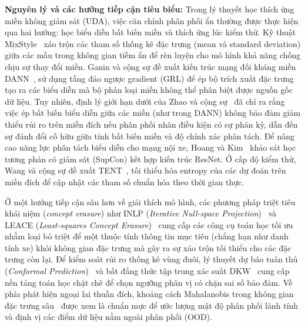 \documentclass[12pt, a4paper, reqno, oneside]{book}
\begin{document}
\textbf{Nguyên lý và các hướng tiếp cận tiêu biểu:}
Trong lý thuyết học thích ứng miền không giám sát (UDA), việc căn chỉnh phân phối ẩn thường được thực hiện qua hai hướng: học biểu diễn bất biến miền và thích ứng lúc kiểm thử. Kỹ thuật MixStyle~\cite{zhou2021mixstyle} xáo trộn các tham số thống kê đặc trưng (mean và standard deviation) giữa các mẫu trong không gian tiềm ẩn để rèn luyện cho mô hình khả năng chống chịu sự thay đổi miền. Ganin và cộng sự đề xuất kiến trúc mạng đối kháng miền DANN~\cite{ganin2016dann}, sử dụng tầng đảo ngược gradient (GRL) để ép bộ trích xuất đặc trưng tạo ra các biểu diễn mà bộ phân loại miền không thể phân biệt được nguồn gốc dữ liệu. Tuy nhiên, định lý giới hạn dưới của Zhao và cộng sự~\cite{zhao2019invariant} đã chỉ ra rằng việc ép bất biến biểu diễn giữa các miền (như trong DANN) không bảo đảm giảm thiểu rủi ro trên miền đích nếu phân phối nhãn điều kiện có sự phân kỳ, dẫn đến sự đánh đổi cố hữu giữa tính bất biến miền và độ chính xác phân tách. Để nâng cao năng lực phân tách biểu diễn cho mạng nội xe, Hoang và Kim~\cite{hoang2022supcon} khảo sát học tương phản có giám sát (SupCon) kết hợp kiến trúc ResNet. Ở cấp độ kiểm thử, Wang và cộng sự đề xuất TENT~\cite{wang2020tent}, tối thiểu hóa entropy của các dự đoán trên miền đích để cập nhật các tham số chuẩn hóa theo thời gian thực.

Ở một hướng tiếp cận sâu hơn về giải thích mô hình, các phương pháp triệt tiêu khái niệm (\textit{concept erasure}) như INLP (\textit{Iterative Null-space Projection})~\cite{ravfogel2020null} và LEACE (\textit{Least-squares Concept Erasure})~\cite{belrose2023leace} cung cấp các công cụ toán học tối ưu nhằm loại bỏ triệt để một thuộc tính thông tin mục tiêu (chẳng hạn như danh tính xe) khỏi không gian đặc trưng mà gây ra sự xáo trộn tối thiểu cho các đặc trưng còn lại. Để kiểm soát rủi ro thống kê vùng đuôi, lý thuyết dự báo tuân thủ (\textit{Conformal Prediction})~\cite{tibshirani2019conformal} và bất đẳng thức tập trung xác suất DKW~\cite{massart1990dkw} cung cấp nền tảng toán học chặt chẽ để chọn ngưỡng phân vị có chặn sai số bảo đảm. Về phía phát hiện ngoại lai thuần đích, khoảng cách Mahalanobis trong không gian đặc trưng sâu~\cite{lee2018mahalanobis} được xem là chuẩn mực để ước lượng mật độ phân phối lành tính và định vị các điểm dữ liệu nằm ngoài phân phối (OOD).
\end{document}
